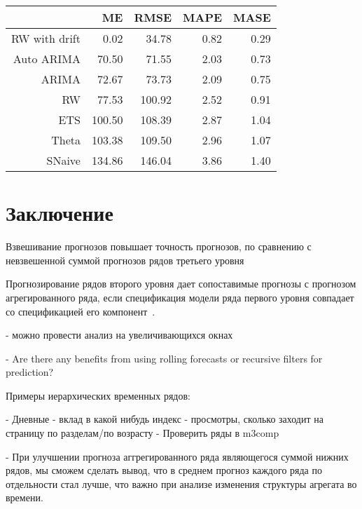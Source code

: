 \documentclass[12pt,a4paper, oneside]{extreport}
\begin{document}
\begin{tabular}{rrrrr}
	\hline
	& ME & RMSE & MAPE & MASE \\ 
	\hline
	RW with drift  & 0.02 & 34.78 & 0.82 & 0.29 \\ 
	Auto ARIMA & 70.50 & 71.55 & 2.03 & 0.73 \\ 
	ARIMA & 72.67 & 73.73 & 2.09 & 0.75 \\ 
	RW & 77.53 & 100.92 & 2.52 & 0.91 \\ 
	ETS & 100.50 & 108.39 & 2.87 & 1.04 \\ 
	Theta & 103.38 & 109.50 & 2.96 & 1.07 \\ 
	SNaive & 134.86 & 146.04 & 3.86 & 1.40 \\ 
	\hline
\end{tabular}




\chapter*{Заключение}

Взвешивание прогнозов повышает точность прогнозов, по сравнению с невзвешенной суммой прогнозов рядов третьего уровня

Прогнозирование рядов второго уровня дает сопоставимые прогнозы с прогнозом агрегированного ряда, если спецификация модели ряда первого уровня совпадает со спецификацией его компонент~\cite{usstat1}. 




- можно провести анализ на увеличивающихся  окнах

- Are there any benefits from using rolling forecasts or recursive filters for prediction?


Примеры иерархических временных рядов:

- Дневные
- вклад в какой нибудь индекс  
- просмотры, сколько заходит на страницу по разделам/по возрасту
- Проверить ряды в m3comp



- При улучшении прогноза аггрегированного ряда являющегося суммой нижних рядов, мы сможем сделать вывод, что в среднем прогноз каждого ряда по отдельности стал лучше, что важно при анализе  изменения структуры  агрегата во времени.
\end{document}
